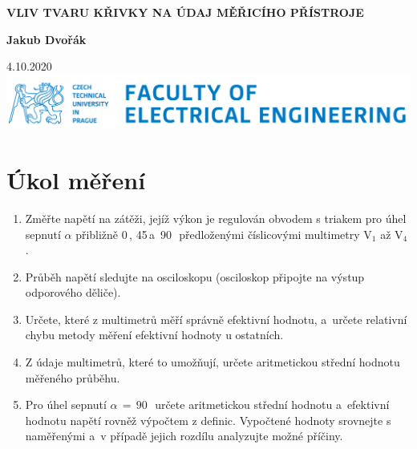 \documentclass[a4paper,12pt]{article}   %
\begin{document}

\begin{titlepage}


    \begin{center}
        \vspace*{1cm}
            
        \Huge
        \textbf{VLIV TVARU KŘIVKY NA ÚDAJ MĚŘICÍHO PŘÍSTROJE}
            
        \vspace{0.5cm}
        \LARGE
        
            
        \vspace{1.5cm}
            
        \textbf{Jakub Dvořák}
            
        \vfill
            
        
            
        \vspace{0.8cm}
            
        

        \Large
            

        4.10.2020\\
        \vspace*{.5cm}
        \includegraphics[width=.4\textwidth]{logo-cvut-fee.png}\\
        
            
    \end{center}
\end{titlepage}

\setcounter{page}{0} %
\pagestyle{empty} %

\newpage
\section{Úkol měření}
\label{zadani}
\begin{enumerate}
    \item Změřte napětí na zátěži, jejíž výkon je regulován obvodem s triakem pro úhel sepnutí $\alpha$ přibližně 0\,\textdegree, 45\,\textdegree a~90\,\textdegree~předloženými číslicovými multimetry $\textrm{V}_1$ až $\textrm{V}_4$.
    \item Průběh napětí sledujte na osciloskopu (osciloskop připojte na výstup odporového děliče).
    \item Určete, které z multimetrů měří správně efektivní hodnotu, a~určete relativní chybu metody měření efektivní hodnoty u ostatních.
    \item Z údaje multimetrů, které to umožňují, určete aritmetickou střední hodnotu měřeného průběhu.
    \item Pro úhel sepnutí $\alpha\,=\,90$\,\textdegree~určete aritmetickou střední hodnotu a~efektivní hodnotu napětí rovněž výpočtem z definic. Vypočtené hodnoty srovnejte s naměřenými a~v případě jejich rozdílu analyzujte možné příčiny.
\end{enumerate}
\end{document}

